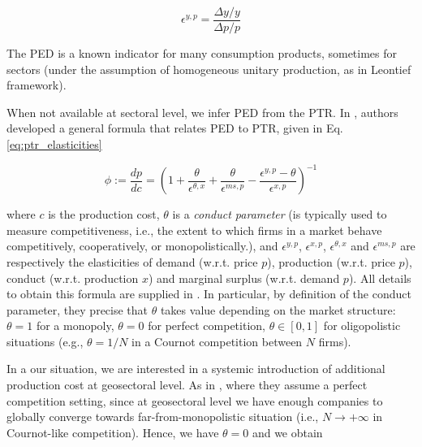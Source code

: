 \documentclass{article}
\begin{document}
\begin{equation}
    \epsilon^{y,p} = \frac{\Delta y / y}{\Delta p / p}
\label{eq:ped}
\end{equation}


\noindent The PED is a known indicator for many consumption products, sometimes for sectors (under the assumption of homogeneous unitary production, as in Leontief framework). 

\vspace{0.1cm}

When not available at sectoral level, we infer PED from the PTR. In \cite{weyl2013pass}, authors developed a general formula that relates PED to PTR, given in Eq. \eqref{eq:ptr_elasticities}

\begin{equation}
\label{eq:ptr_elasticities}
    \phi := \frac{dp}{dc} = \left( 1 + \frac{\theta}{\epsilon^{\theta,x}}+ \frac{\theta}{\epsilon^{ms,p}} - \frac{\epsilon^{y,p} - \theta}{\epsilon^{x,p}} \right)^{-1}
\end{equation}

\noindent where $c$ is the production cost, $\theta$ 
is a \textit{conduct parameter} (is typically used to measure competitiveness, i.e., the extent to which firms in a market behave competitively, cooperatively, or monopolistically.), and $\epsilon^{y,p}$, $\epsilon^{x,p}$, $\epsilon^{\theta,x}$ and $\epsilon^{ms,p}$ are respectively the elasticities of demand (w.r.t. price $p$), production (w.r.t. price $p$), conduct (w.r.t. production $x$) and marginal surplus (w.r.t. demand $p$). All details to obtain this formula are supplied in \cite{weyl2013pass,rbb2014cost}. In particular, by definition of the conduct parameter, they precise that $\theta$ takes value depending on the market structure: $\theta=1$ for a monopoly, $\theta=0$ for perfect competition, $\theta \in [0,1]$ for oligopolistic situations (e.g., $\theta=1/N$ in a Cournot competition between $N$ firms). 

In a our situation, we are interested in a systemic introduction of additional production cost at geosectoral level. As in \cite{desnos2023climate}, where they assume a perfect competition setting, since at geosectoral level we have enough companies to globally converge towards far-from-monopolistic situation (i.e., $N \rightarrow +\infty$ in Cournot-like competition). Hence, we have $\theta=0$ and we obtain
\end{document}

